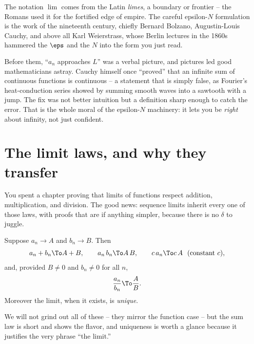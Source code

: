 \begin{historybox}
The notation $\lim$ comes from the Latin \emph{limes}, a boundary or frontier --
the Romans used it for the fortified edge of empire. The careful epsilon-$N$
formulation is the work of the nineteenth century, chiefly Bernard Bolzano,
Augustin-Louis Cauchy, and above all Karl Weierstrass, whose Berlin lectures in
the 1860s hammered the $\eps$ and the $N$ into the form you just read.

Before them, ``$a_n$ approaches $L$'' was a verbal picture, and pictures led good
mathematicians astray. Cauchy himself once ``proved'' that an infinite sum of
continuous functions is continuous -- a statement that is simply false, as
Fourier's heat-conduction series showed by summing smooth waves into a sawtooth
with a jump. The fix was not better intuition but a definition sharp enough to
catch the error. That is the whole moral of the epsilon-$N$ machinery: it lets
you be \emph{right} about infinity, not just confident.
\end{historybox}

\section{The limit laws, and why they transfer}
\label{ch28:limit-laws}

You spent a chapter proving that limits of functions respect addition,
multiplication, and division. The good news: sequence limits inherit every one
of those laws, with proofs that are if anything simpler, because there is no
$\delta$ to juggle.

\begin{theorem}
\label{ch28:thm-laws}
Suppose $a_n \to A$ and $b_n \to B$. Then
\[
  a_n + b_n \To A + B, \qquad
  a_n\,b_n \To A\,B, \qquad
  c\,a_n \To c\,A \ \ (\text{constant } c),
\]
and, provided $B \ne 0$ and $b_n \ne 0$ for all $n$,
\[
  \frac{a_n}{b_n} \To \frac{A}{B}.
\]
Moreover the limit, when it exists, is \emph{unique}.
\end{theorem}

We will not grind out all of these -- they mirror the function case -- but the
sum law is short and shows the flavor, and uniqueness is worth a glance because
it justifies the very phrase ``the limit.''

